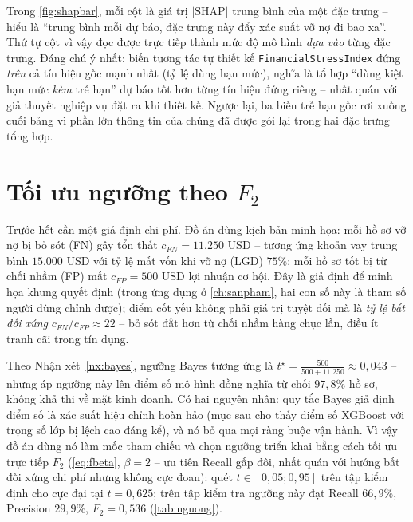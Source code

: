 \documentclass[12pt,a4paper,oneside]{report}
\theoremstyle{vnplain}
\theoremstyle{vndef}
\begin{document}
\noindent Trong \cref{fig:shapbar}, mỗi cột là giá trị $|\text{SHAP}|$ trung bình của một đặc trưng
-- hiểu là ``trung bình mỗi dự báo, đặc trưng này đẩy xác suất vỡ nợ đi bao xa''. Thứ tự
cột vì vậy đọc được trực tiếp thành mức độ mô hình \emph{dựa vào} từng đặc trưng. Đáng
chú ý nhất: biến tương tác tự thiết kế \texttt{FinancialStressIndex} đứng \emph{trên} cả
tín hiệu gốc mạnh nhất (tỷ lệ dùng hạn mức), nghĩa là tổ hợp ``dùng kiệt hạn mức
\emph{kèm} trễ hạn'' dự báo tốt hơn từng tín hiệu đứng riêng -- nhất quán với giả thuyết nghiệp vụ
đặt ra khi thiết kế. Ngược lại, ba biến trễ hạn gốc rơi xuống cuối bảng vì phần lớn thông
tin của chúng đã được gói lại trong hai đặc trưng tổng hợp.

\section{Tối ưu ngưỡng theo \texorpdfstring{$F_2$}{F2}}\label{sec:nguong}
Trước hết cần một giả định chi phí. Đồ án dùng kịch bản minh họa: mỗi hồ sơ vỡ nợ bị bỏ
sót (FN) gây tổn thất $c_{FN}=11.250$ USD -- tương ứng khoản vay trung bình $15.000$ USD
với tỷ lệ mất vốn khi vỡ nợ (LGD) $75\%$; mỗi hồ sơ tốt bị từ chối nhầm (FP) mất
$c_{FP}=500$ USD lợi nhuận cơ hội. Đây là giả định để minh họa khung quyết định (trong
ứng dụng ở \cref{ch:sanpham}, hai con số này là tham số người dùng chỉnh được); điểm cốt
yếu không phải giá trị tuyệt đối mà là \emph{tỷ lệ bất đối xứng} $c_{FN}/c_{FP}\approx 22$
-- bỏ sót đắt hơn từ chối nhầm hàng chục lần, điều ít tranh cãi trong tín dụng.

Theo Nhận xét~\ref{nx:bayes}, ngưỡng Bayes tương ứng là
$t^\star=\frac{500}{500+11.250}\approx 0{,}043$ -- nhưng áp ngưỡng này lên điểm số mô
hình đồng nghĩa từ chối $97{,}8\%$ hồ sơ, không khả thi về mặt kinh doanh. Có hai
nguyên nhân: quy tắc Bayes giả định điểm số là xác suất hiệu chỉnh hoàn hảo (mục sau cho
thấy điểm số XGBoost với trọng số lớp bị lệch cao đáng kể), và nó bỏ qua mọi ràng buộc
vận hành. Vì vậy đồ án dùng nó làm mốc tham chiếu và chọn ngưỡng triển khai bằng cách
tối ưu trực tiếp $F_2$ (\cref{eq:fbeta}, $\beta=2$ -- ưu tiên Recall gấp đôi, nhất quán
với hướng bất đối xứng chi phí nhưng không cực đoan): quét $t\in[0{,}05;0{,}95]$ trên
tập kiểm định cho cực đại tại $t=0{,}625$; trên tập kiểm tra ngưỡng này đạt Recall
$66{,}9\%$, Precision $29{,}9\%$, $F_2=0{,}536$ (\cref{tab:nguong}).
\end{document}
